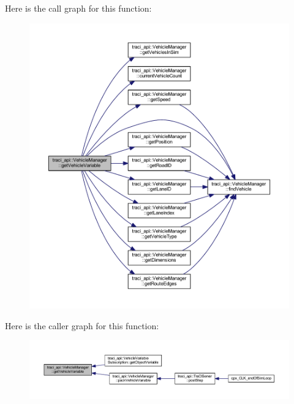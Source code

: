 Here is the call graph for this function\+:\nopagebreak
\begin{figure}[H]
\begin{center}
\leavevmode
\includegraphics[width=350pt]{classtraci__api_1_1_vehicle_manager_a6926963a4f6914be50a1b75833574249_cgraph}
\end{center}
\end{figure}
Here is the caller graph for this function\+:\nopagebreak
\begin{figure}[H]
\begin{center}
\leavevmode
\includegraphics[width=350pt]{classtraci__api_1_1_vehicle_manager_a6926963a4f6914be50a1b75833574249_icgraph}
\end{center}
\end{figure}
\mbox{\label{classtraci__api_1_1_vehicle_manager_af404c1fa8e1459cbf415d1f4931c3ad6}} 
